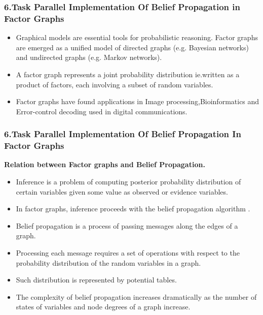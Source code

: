 \documentclass{beamer}
\begin{document}
\begin{frame}
\frametitle{\textbf{6.Task Parallel Implementation Of Belief Propagation in Factor Graphs}}
\begin{itemize}
\item Graphical models are essential tools for probabilistic reasoning. Factor graphs  are  emerged as a unified model of directed graphs (e.g. Bayesian networks) and undirected graphs (e.g. Markov networks).
\item  A factor graph  represents a joint probability distribution ie.written as a product of factors, each involving a subset of random variables.
\item Factor graphs have found applications in   Image processing,Bioinformatics and  Error-control decoding used in digital communications.\\
\end{itemize}
\end{frame}


\begin{frame}
\frametitle{\textbf{6.Task Parallel Implementation Of Belief Propagation In Factor Graphs}}
\textbf{Relation between  Factor graphs and Belief Propagation.}
\begin{itemize}
  \item Inference is a problem of computing posterior probability distribution of certain variables given some value as observed or evidence variables.
  \item In factor graphs, inference proceeds with the belief propagation algorithm .
  \item Belief propagation is a process of passing messages along the edges of a graph.
  \item Processing each message requires a set of operations with respect to the probability distribution of the random variables in a graph.
  \item Such distribution is represented by potential tables.
  \item The complexity of belief propagation increases dramatically as the number of states of variables and node degrees of a graph increase.
\end{itemize}
\end{frame}
\end{document}
